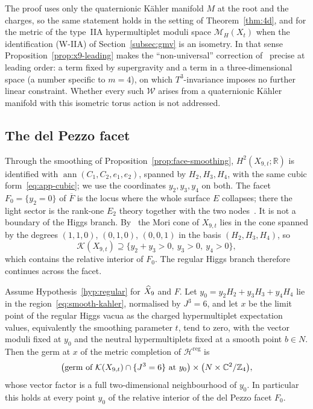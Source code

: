 The proof uses only the quaternionic K\"ahler manifold $M$ at the root and the charges, so the same
statement holds in the setting of Theorem~\ref{thm:4d}, and for the metric of the type~IIA
hypermultiplet moduli space $\mathcal M_H(X_t)$ when the identification (W-IIA) of
Section~\ref{subsec:gmv} is an isometry. In that sense Proposition~\ref{prop:x9-leading} makes the
``non-universal'' correction of~\cite[Sect.~6]{Greene:1996Confinement} precise at leading order: a term
fixed by supergravity and a term in a three-dimensional space (a number specific to $m=4$), on which
$T^3$-invariance imposes no further linear constraint. Whether every such $\mathcal W$ arises from a quaternionic K\"ahler manifold with this isometric
torus action is not addressed.

\subsection{The del Pezzo facet}
\label{subsec:wall}

Through the smoothing of Proposition~\ref{prop:face-smoothing}, $H^2(X_{9,t};\mathbb R)$ is
identified with $\operatorname{ann}(C_1,C_2,e_1,e_2)$, spanned by $H_2,H_3,H_4$, with the same
cubic form~\eqref{eq:app-cubic}; we use the coordinates $y_2,y_3,y_4$ on both. The facet
$F_0=\{y_2=0\}$ of $\overline F$ is the locus where the whole surface $E$ collapses; there the light sector is the rank-one $E_2$ theory together with the two
nodes~\cite{W26global,W26quantum}. It is not a
boundary of the Higgs branch. By~\cite[eq.~(5.25)]{W26quantum} the Mori cone of $X_{9,t}$ lies
in the cone spanned by the degrees $(1,1,0)$, $(0,1,0)$, $(0,0,1)$ in the basis
$(H_2,H_3,H_4)$, so
\begin{equation}
 \mathcal K(X_{9,t})\supseteq\{y_2+y_3>0,\ y_3>0,\ y_4>0\},
 \label{eq:smooth-kahler}
\end{equation}
which contains the relative interior of $F_0$. The regular Higgs branch therefore continues
across the facet.

\begin{theorem}\label{thm:wall}
Assume Hypothesis~\ref{hyp:regular} for $\widehat X_9$ and $F$. Let $y_0=y_2H_2+y_3H_3+y_4H_4$ lie in
the region~\eqref{eq:smooth-kahler}, normalised by $J^3=6$, and let $x$ be the limit point of the
regular Higgs vacua as the charged hypermultiplet expectation values, equivalently the smoothing
parameter $t$, tend to zero, with the vector moduli fixed at $y_0$ and the neutral
hypermultiplets fixed at a smooth point $b\in N$. Then the germ at $x$ of the metric completion of
$\mathcal H^{\mathrm{reg}}$ is
\begin{equation}
 \bigl(\text{germ of }\mathcal K(X_{9,t})\cap\{J^3=6\}\text{ at }y_0\bigr)\times
 \bigl(N\times\mathbb C^2/\mathbb Z_4\bigr),
 \label{eq:thm-wall}
\end{equation}
whose vector factor is a full two-dimensional neighbourhood of $y_0$. In particular this holds
at every point $y_0$ of the relative interior of the del Pezzo facet $F_0$.
\end{theorem}


